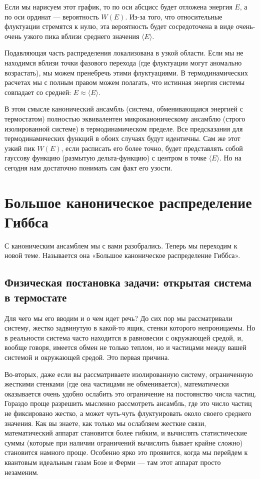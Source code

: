 \documentclass[../general/general]{subfiles}
\begin{document}
Если мы нарисуем этот график, то по оси абсцисс будет отложена энергия $E$, а по оси ординат — вероятность $W(E)$. Из-за того, что относительные флуктуации стремятся к нулю, эта вероятность будет сосредоточена в виде очень-очень узкого пика вблизи среднего значения $\langle E \rangle$. 

Подавляющая часть распределения локализована в узкой области. Если мы не находимся вблизи точки фазового перехода (где флуктуации могут аномально возрастать), мы можем пренебречь этими флуктуациями. В термодинамических расчетах мы с полным правом можем полагать, что истинная энергия системы совпадает со средней: $E \approx \langle E \rangle$. 

В этом смысле канонический ансамбль (система, обменивающаяся энергией с термостатом) полностью эквивалентен микроканоническому ансамблю (строго изолированной системе) в термодинамическом пределе. Все предсказания для термодинамических функций в обоих случаях будут идентичны. Сам же этот узкий пик $W(E)$, если расписать его более точно, будет представлять собой гауссову функцию (размытую дельта-функцию) с центром в точке $\langle E \rangle$. Но на сегодня нам достаточно понимать сам факт его узости.


\section{Большое каноническое распределение Гиббса}

С каноническим ансамблем мы с вами разобрались. Теперь мы переходим к новой теме. Называется она «Большое каноническое распределение Гиббса». 

\subsection{Физическая постановка задачи: открытая система в термостате}

Для чего мы его вводим и о чем идет речь? До сих пор мы рассматривали систему, жестко задвинутую в какой-то ящик, стенки которого непроницаемы. Но в реальности система часто находится в равновесии с окружающей средой, и, вообще говоря, имеется обмен не только теплом, но и частицами между вашей системой и окружающей средой. Это первая причина.

Во-вторых, даже если вы рассматриваете изолированную систему, ограниченную жесткими стенками (где она частицами не обменивается), математически оказывается очень удобно ослабить это ограничение на постоянство числа частиц. Гораздо проще разрешить мысленно рассмотреть ансамбль, где это число частиц не фиксировано жестко, а может чуть-чуть флуктуировать около своего среднего значения. Как вы знаете, как только мы ослабляем жесткие связи, математический аппарат становится более гибким, и вычислять статистические суммы (которые при наличии ограничений вычислить бывает крайне сложно) становится намного проще. Особенно ярко это проявится, когда мы перейдем к квантовым идеальным газам Бозе и Ферми — там этот аппарат просто незаменим.
\end{document}
